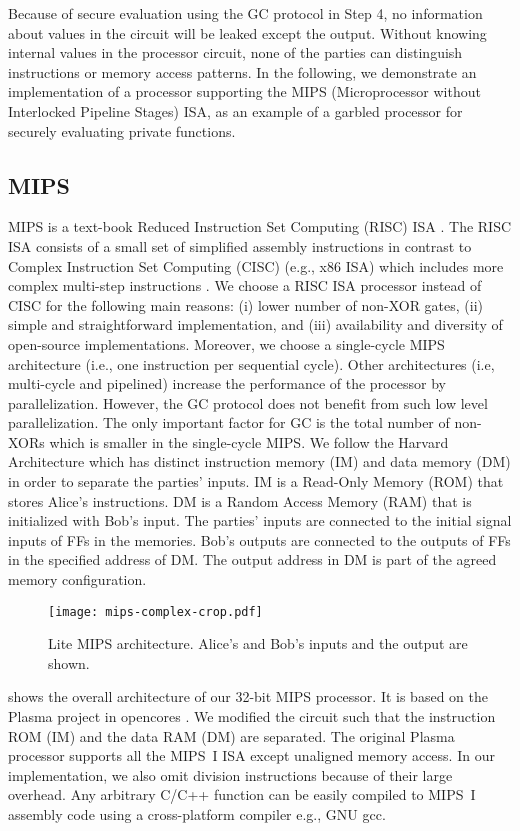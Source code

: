 Because of secure evaluation using the GC protocol in Step 4, no information about values in the circuit will be leaked except the output.
Without knowing internal values in the processor circuit, none of the parties can distinguish instructions or memory access patterns.
In the following, we demonstrate an implementation of a processor supporting the MIPS (Microprocessor without Interlocked Pipeline Stages) ISA, as an example of a garbled processor for securely evaluating private functions.

\subsection{MIPS}
MIPS is a text-book Reduced Instruction Set Computing (RISC) ISA \cite{kane1992mips}.
The RISC ISA consists of a small set of simplified assembly instructions in contrast to Complex Instruction Set Computing (CISC) (e.g., x86 ISA) which includes more complex multi-step instructions \cite{hennessy2012computer}.
We choose a RISC ISA processor instead of CISC for the following main reasons: (i) lower number of non-XOR gates, (ii) simple and straightforward implementation, and (iii) availability and diversity of open-source implementations.
Moreover, we choose a single-cycle MIPS architecture (i.e., one instruction per sequential cycle).
Other architectures (i.e, multi-cycle and pipelined) increase the performance of the processor by parallelization.
However, the GC protocol does not benefit from such low level parallelization.
The only important factor for GC is the total number of non-XORs which is smaller in the single-cycle MIPS.
We follow the Harvard Architecture which has distinct instruction memory (IM) and data memory (DM) in order to separate the parties' inputs.
IM is a Read-Only Memory (ROM) that stores Alice's instructions.
DM is a Random Access Memory (RAM) that is initialized with Bob's input.
The parties' inputs are connected to the initial signal inputs of FFs in the memories.
Bob's outputs are connected to the outputs of FFs in the specified address of DM.
The output address in DM is part of the agreed memory configuration.

\begin{figure*}[ht]
\centering
\texttt{[image: mips-complex-crop.pdf]}
\caption{Lite MIPS architecture.
  Alice's and Bob's inputs and the output are shown.}\label{figure:mips}
\end{figure*}

 shows the overall architecture of our 32-bit MIPS processor.
It is based on the Plasma project in opencores \cite{rhoads2006plasma}.
We modified the circuit such that the instruction ROM (IM) and the data RAM (DM) are separated.
The original Plasma processor supports all the MIPS~I ISA except unaligned memory access.
In our implementation, we also omit division instructions because of their large overhead.
Any arbitrary C/C++ function can be easily compiled to MIPS~I assembly code using a cross-platform compiler e.g., GNU gcc.

